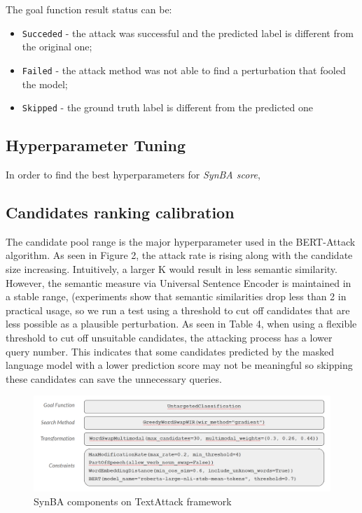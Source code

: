 The goal function result status can be:
\begin{itemize}
    \item \texttt{Succeded} - the attack was successful and the predicted label is different from the original one;
    \item \texttt{Failed} - the attack method was not able to find a perturbation that fooled the model;
    \item \texttt{Skipped} - the ground truth label is different from the predicted one
\end{itemize}


\subsection{Hyperparameter Tuning}\label{subsec:hyperparameter-tuning}

In order to find the best hyperparameters for \emph{SynBA score}, 


\subsection{Candidates ranking calibration}\label{subsec:candidates-ranking-calibration}
The candidate pool range is the major hyperparameter used in the BERT-Attack algorithm. As seen in Figure 2, the attack rate is rising along with the candidate size increasing. Intuitively, a larger 
K would result in less semantic similarity. However, the semantic measure via Universal Sentence Encoder is maintained in a stable range, (experiments show that semantic similarities drop less than 2%
in practical usage, so we run a test using a threshold to cut off candidates that are less possible as a plausible perturbation. As seen in Table 4, when using a flexible threshold to cut off unsuitable candidates, the attacking process has a lower query number. This indicates that some candidates predicted by the masked language model with a lower prediction score may not be meaningful so skipping these candidates can save the unnecessary queries.

\begin{figure}
    \centering
    \includegraphics[width=0.8\linewidth]{images/3_synba_components.png}
    \caption{SynBA components on TextAttack framework}
    \label{fig:3_3_synba_components}
\end{figure}


